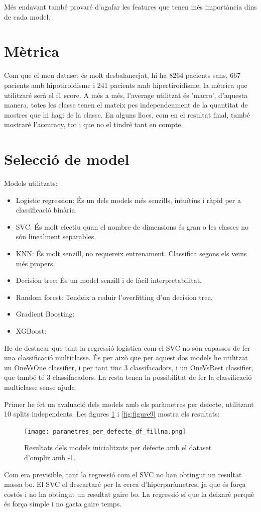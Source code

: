 \documentclass[9pt,a4paper,twoside]{tau-class/tau}
\begin{document}
    Més endavant també provaré d'agafar les features que tenen més importància dins de cada model.

    \section{Mètrica}
    Com que el meu dataset és molt desbalancejat, hi ha 8264 pacients sans, 667 pacients amb hipotiroidisme i 241 pacients amb hipertiroidisme, la mètrica que utilitzaré serà el f1 score. A més a més, l'average utilitzat és 'macro', d'aquesta manera, totes les classe tenen el mateix pes independenment de la quantitat de mostres que hi hagi de la classe.
    En alguns llocs, com en el resultat final, també mostraré l'accuracy, tot i que no el tindré tant en compte.


    \section{Selecció de model}
    Models utilitzats:
    \begin{itemize}
        \item Logistic regression: És un dels models més senzills, intuïtius i ràpid per a classificació binària.
        \item SVC: És molt efectiu quan el nombre de dimensions és gran o les classes no són linealment separables.
        \item KNN: És molt senzill, no requereix entrenament. Classifica segons els veins més propers.
        \item Decision tree: És un model senzill i de fàcil interpretabilitat.
        \item Random forest: Tendeix a reduir l'overfitting d'un decision tree.
        \item Gradient Boosting:
        \item XGBoost:
    \end{itemize}
    He de destacar que tant la regressió logística com el SVC no són capassos de fer una classificació multiclasse. És per això que per aquest dos models he utilitzat un OneVsOne classifier, i per tant tinc 3 classifacadors, i un OneVsRest classifier, que també té 3 classifacadors. La resta tenen la possibilitat de fer la classificació multiclasse sense ajuda.

    Primer he fet un avaluació dels models amb els paràmetres per defecte, utilitzant 10 splits independents. Les figures \ref{fig:figure8} i \ref{fig:figure9} mostra els resultats:
    \begin{figure}[H]
        \centering
        \texttt{[image: parametres\_per\_defecte\_df\_fillna.png]}
        \caption{Resultats dels models inicialitzats per defecte amb el dataset d'omplir amb -1.}
        \label{fig:figure8}
    \end{figure}
    Com era previsible, tant la regressió com el SVC no han obtingut un resultat massa bo. El SVC el descartaré per la cerca d'hiperparàmetres, ja que és força costós i no ha obtingut un resultat gaire bo. La regressió sí que la deixaré perquè és força simple i no gasta gaire temps.
\end{document}
